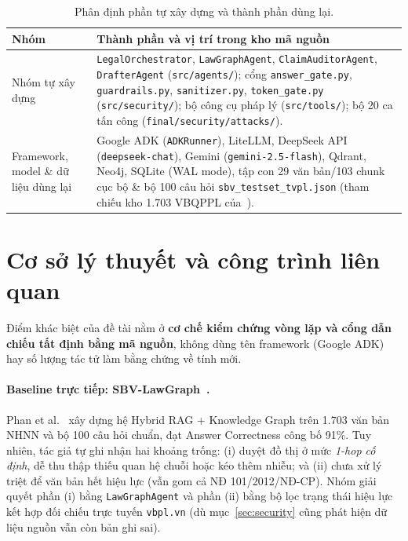 \documentclass[sigconf,nonacm]{acmart}
\begin{document}
\begin{table}[t]
\caption{Phân định phần tự xây dựng và thành phần dùng lại.}
\label{tab:ownership}
\footnotesize
\begin{tabular}{@{}p{2.3cm}p{5.7cm}@{}}
\toprule
\textbf{Nhóm} & \textbf{Thành phần và vị trí trong kho mã nguồn} \\
\midrule
Nhóm tự xây dựng & \texttt{LegalOrchestrator}, \texttt{LawGraphAgent}, \texttt{ClaimAuditorAgent}, \texttt{DrafterAgent} (\texttt{src/agents/}); cổng \texttt{answer\_gate.py}, \texttt{guardrails.py}, \texttt{sanitizer.py}, \texttt{token\_gate.py} (\texttt{src/security/}); bộ công cụ pháp lý (\texttt{src/tools/}); bộ 20 ca tấn công (\texttt{final/security/attacks/}). \\
\midrule
Framework, model \& dữ liệu dùng lại & Google ADK (\texttt{ADKRunner}), LiteLLM, DeepSeek API (\texttt{deepseek-chat}), Gemini (\texttt{gemini-2.5-flash}), Qdrant, Neo4j, SQLite (WAL mode), tập con 29 văn bản/103 chunk cục bộ \& bộ 100 câu hỏi \texttt{sbv\_testset\_tvpl.json} (tham chiếu kho 1.703 VBQPPL của~\cite{phan2026sbv}). \\
\bottomrule
\end{tabular}
\end{table}

\section{Cơ sở lý thuyết và công trình liên quan}
\label{sec:related}

Điểm khác biệt của đề tài nằm ở \textbf{cơ chế kiểm chứng vòng lặp và cổng dẫn chiếu tất định bằng mã nguồn}, không dùng tên framework (Google ADK) hay số lượng tác tử làm bằng chứng về tính mới.

\paragraph{Baseline trực tiếp: SBV-LawGraph~\cite{phan2026sbv}.}
Phan et al.~\cite{phan2026sbv} xây dựng hệ Hybrid RAG + Knowledge Graph trên 1.703 văn bản NHNN và bộ 100 câu hỏi chuẩn, đạt Answer Correctness công bố 91\%. Tuy nhiên, tác giả tự ghi nhận hai khoảng trống: (i) duyệt đồ thị ở mức \emph{1-hop cố định}, dễ thu thập thiếu quan hệ chuỗi hoặc kéo thêm nhiễu; và (ii) chưa xử lý triệt để văn bản hết hiệu lực (vẫn gom cả NĐ 101/2012/NĐ-CP). Nhóm giải quyết phần (i) bằng \texttt{LawGraphAgent} và phần (ii) bằng bộ lọc trạng thái hiệu lực kết hợp đối chiếu trực tuyến \texttt{vbpl.vn} (dù mục~\ref{sec:security} cũng phát hiện dữ liệu nguồn vẫn còn bản ghi sai).
\end{document}
